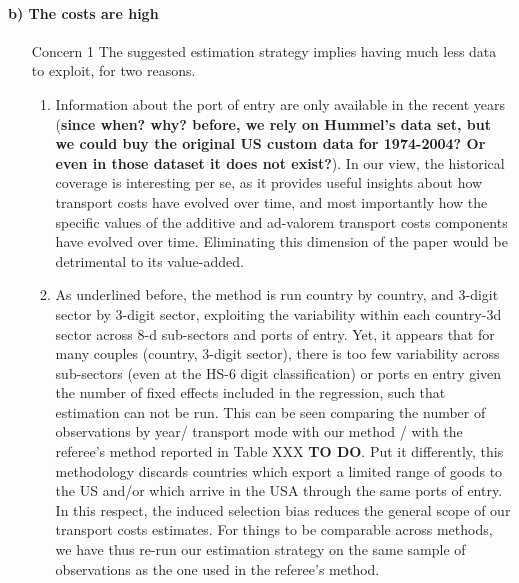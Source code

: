 \documentclass[a4paper,12pt]{article}
\begin{document}
\paragraph{b) The costs are high}
\begin{itemize}
\item[Concern 1] The suggested estimation strategy implies having much less data to exploit, for two reasons.
\begin{enumerate}
\item Information about the port of entry are only available in the recent years (\textbf{since when? why? before, we rely on Hummel's data set, but we could buy the original US custom data for 1974-2004? Or even in those dataset it does not exist?}). In our view, the historical coverage is interesting per se, as it provides useful insights about how transport costs have evolved over time, and most importantly how the specific values of the additive and ad-valorem transport costs components have evolved over time. Eliminating this dimension of the paper would be detrimental to its value-added.
\item As underlined before, the method is run country by country, and 3-digit sector by 3-digit sector, exploiting the variability within each country-3d sector across 8-d sub-sectors and ports of entry. Yet, it appears that for many couples (country, 3-digit sector), there is too few variability across sub-sectors (even at the HS-6 digit classification) or ports en entry given the number of fixed effects included in the regression, such that estimation can not be run. This can be seen comparing the number of observations by year/ transport mode with our method / with the referee's method reported in Table XXX \textbf{TO DO}. Put it differently, this methodology discards countries which export a limited range of goods to the US and/or which arrive in the USA through the same ports of entry. In this respect, the induced selection bias reduces the general scope of our transport costs estimates. For things to be comparable across methods, we have thus re-run our estimation strategy on the same sample of observations as the one used in the referee's method.


\end{enumerate}
\end{itemize}
\end{document}
